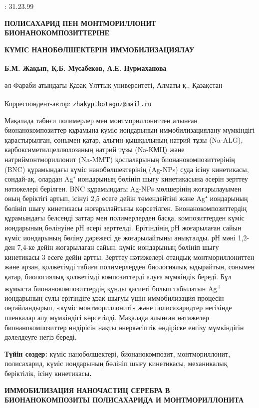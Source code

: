 : 31.23.99

{\bfseries ПОЛИСАХАРИД ПЕН МОНТМОРИЛЛОНИТ БИОНАНОКОМПОЗИТТЕРІНЕ}

{\bfseries КҮМІС НАНОБӨЛШЕКТЕРІН ИММОБИЛИЗАЦИЯЛАУ}

{\bfseries Б.М. Жақып\textsuperscript{\envelope }, Қ.Б. Мусабеков, А.Е. Нурмаханова}

әл-Фараби атындағы Қазақ Ұлттық университеті, Алматы қ., Қазақстан

{\bfseries \textsuperscript{\envelope }}Корреспондент-автор:
\href{mailto:zhakyp.botagoz@mail.ru}{\nolinkurl{zhakyp.botagoz@mail.ru}}

Мақалада табиғи полимерлер мен монтмориллониттен алынған
бионанокомпозиттер құрамына күміс иондарының иммобилизациялану
мүмкіндігі қарастырылған, сонымен қатар, альгин қышқылының натрий тұзы
(Na-ALG), карбоксиметилцеллюлозаның натрий тұзы (Na-КМЦ) және
натриймонтмориллонит (Na-MMT) қоспаларының бионанокомпозиттерінің (BNC)
құрамындағы күміс нанобөлшектерінің (Ag-NPs) суда ісіну кинетикасы,
сондай-ақ, олардан Ag⁺ иондарының бөлініп шығу кинетикасына әсерін
зерттеу нәтижелері берілген. BNC құрамындағы Ag-NPs мөлшерінің
жоғарылауымен оның беріктігі артып, ісінуі 2,5 есеге дейін төмендейтіні
және Ag⁺ иондарының бөлініп шығу кинетикасы жоғарылайтыны көрсетілген.
Бионанокомпозиттердің құрамындағы белсенді заттар мен полимерлерден
басқа, композиттерден күміс иондарының бөлінуіне рН әсері зерттелді.
Ерітіндінің рН жоғарылаған сайын күміс иондарының бөліну дәрежесі де
жоғарылайтыны анықталды. рН мәні 1,2-ден 7,4-ке дейін жоғарылаған сайын,
күміс иондарының бөлініп шығу кинетикасы 3 есеге дейін артты. Зерттеу
нәтижелері отандық монтмориллониттен және арзан, қолжетімді табиғи
полимерлерден биологиялық ыдырайтын, сонымен қатар, биологиялық
қолжетімді композиттерді алуға мүмкіндік береді. Бұл жұмыста
бионанокомпозиттердің құнды қасиеті болып табылатын
Ag\textsuperscript{+} иондарының сулы ерітіндіге ұзақ шығуы үшін
иммобилизация процесін оңтайландырып, «күміс монтмориллониті» және
полисахаридтер негізінде пленкалар алу мүмкіндігі көрсетілді. Мақалада
алынған нәтижелер бионанокомпозиттер өндірісін нақты өнеркәсіптік
өндіріске енгізу мүмкіндігін дәлелдеуге негіз береді.

{\bfseries Түйін сөздер:} күміс нанобөлшектері, бионанокомпозит,
монтмориллонит, полисахарид, күміс иондарының бөлініп шығу кинетикасы,
механикалық беріктілік, ісіну кинетикасы{\bfseries .}

{\bfseries ИММОБИЛИЗАЦИЯ НАНОЧАСТИЦ СЕРЕБРА В БИОНАНОКОМПОЗИТЫ ПОЛИСАХАРИДА
И МОНТМОРИЛЛОНИТА}

